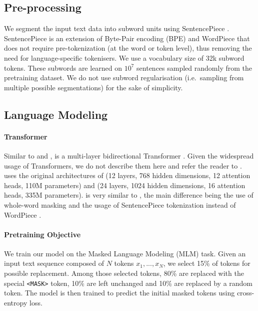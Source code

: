 


\subsection{Pre-processing}
We segment the input text data into subword units using SentencePiece \cite{kudo-richardson-2018-sentencepiece}.
SentencePiece is an extension of Byte-Pair encoding (BPE) \cite{sennrich-etal-2016-neural} and WordPiece \cite{kudo-2018-subword} that does not require pre-tokenization (at the word or token level), thus removing the need for language-specific tokenisers.
We use a vocabulary size of 32k subword tokens. These subwords are learned on $10^7$ sentences sampled randomly from the pretraining dataset.
We do not use subword regularisation (i.e.~sampling from multiple possible segmentations) for the sake of simplicity.


\subsection{Language Modeling}

\paragraph{Transformer}
Similar to \roberta and \bert, \camembert is a multi-layer bidirectional Transformer \cite{vaswani-etal-2017-attention}. Given the widespread usage of Transformers, we do not describe them here and refer the reader to \citep{vaswani-etal-2017-attention}.
\camembert uses the original architectures of \bertbase (12 layers, 768 hidden dimensions, 12 attention heads, 110M parameters) and \bertlarge (24 layers, 1024 hidden dimensions, 16 attention heads, 335M parameters).
\camembert is very similar to \roberta, the main difference being the use of whole-word masking and the usage of SentencePiece tokenization \cite{kudo-richardson-2018-sentencepiece} instead of WordPiece \cite{schuster-nakajima-2012-japanese}.

\paragraph{Pretraining Objective}
We train our model on the Masked Language Modeling (MLM) task.
Given an input text sequence composed of $N$ tokens $x_1, ..., x_N$, we select 15\% of tokens for possible replacement. Among those selected tokens, 80\% are replaced with the special \texttt{<MASK>} token, 10\% are left unchanged and 10\% are replaced by a random token. The model is then trained to predict the initial masked tokens using cross-entropy loss.

